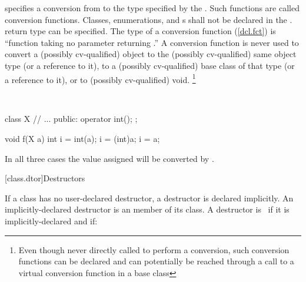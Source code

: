 \documentclass[american]{book}
\begin{document}
\begin{paras}
specifies a conversion from
to the type specified by the
.
Such  functions are called conversion functions.
Classes, enumerations, and
s
shall not be declared in the
.
 return type can be specified.
%
The type of a conversion function (\ref{dcl.fct}) is
``function taking no parameter  returning
.''
A conversion function is never used to convert a (possibly cv-qualified) object
to the (possibly cv-qualified) same object type (or a reference to it),
to a (possibly cv-qualified) base class of that type (or a reference to it),
or to (possibly cv-qualified) void.%
\footnote{
Even though never directly called to perform a conversion,
such conversion functions can be declared and can potentially
be reached through a call to a virtual conversion function in a base class
}

\enterexample\ 

\begin{codeblock}
class X {
    // ...
public:
    operator int();
};

void f(X a)
{
    int i = int(a);
    i = (int)a;
    i = a;
}
\end{codeblock}

In all three cases the value assigned will be converted by
.
\exitexample\ 

[class.dtor]{Destructors}

\setcounter{Paras}{2}
\pnum
{}%
%
%
If a class has no user-declared
destructor, 
a destructor is declared implicitly.
An implicitly-declared destructor is an
member of its class. 
A destructor is
\ 
if it is implicitly-declared and if:


\end{paras}
\end{document}

